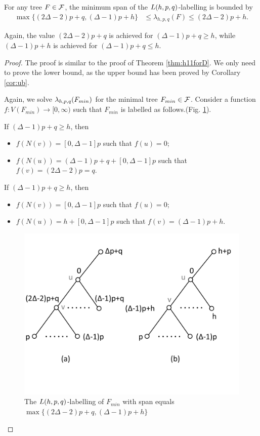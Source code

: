 \begin{theorem}
\label{thm:h11forF}
For any tree $F \in {\cal F}$, the minimum span of the $L(h,p,q)$-labelling is bounded by 
\begin{align*}
\max\{(2\Delta - 2)p+q, (\Delta-1)p+h\} &\le \lambda_{h,p,q}(F) \le (2\Delta-2)p + h.
\end{align*} 
\end{theorem}

Again, the value $(2\Delta - 2)p+q$ is achieved for $(\Delta-1)p+q \ge h$, while $(\Delta-1)p+h$ is achieved for $(\Delta-1)p+q \le h$. 
\begin{proof}
The proof is similar to the proof of Theorem \ref{thm:h11forD}. We only need to prove the lower bound, as the upper bound has been proved by Corollary \ref{cor:ub}. 

Again, we solve $\lambda_{h,p,q}(F_{min})$ for the minimal tree $F_{min} \in {\cal F}$. Consider a function $f:V(F_{min}) \rightarrow [0,\infty)$ such that $F_{min}$ is labelled as follows.(Fig. \ref{ce4}). 

If $(\Delta-1)p+q \ge h$, then
\begin{itemize}
\item $f\left(N(v)\right) = [0, \Delta-1]p$ such that $f(u)=0$;
\item $f\left(N(u)\right) = (\Delta-1)p+q+[0,\Delta-1]p$ such that $f(v) = (2\Delta-2)p=q$. 
\end{itemize}

If $(\Delta-1)p+q \ge h$, then 
\begin{itemize}
\item $f\left(N(v)\right) = [0, \Delta-1]p$ such that $f(u) = 0$; 
\item $f\left(N(u)\right) = h+[0,\Delta-1]p$ such that $f(v) = (\Delta-1)p+h$. 
\end{itemize}

\begin{figure}
\centering
      \vspace{-10pt}
    \includegraphics[scale=0.4]{../figures/fig3-8.pdf}
        \vspace{-40pt}
\caption{The $L(h,p,q)$-labelling of $F_{min}$ with span equals $\max\{(2\Delta - 2)p+q, (\Delta-1)p+h\}$} 
\label{ce4}
\end{figure}


\end{proof}

